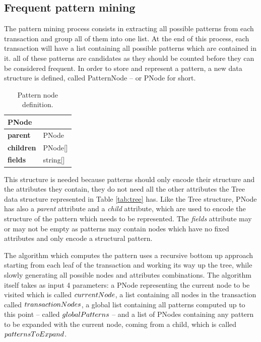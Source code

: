 \documentclass{acm_proc_article-sp-sigmod09}
\begin{document}
\subsection{Frequent pattern mining}
\label{sec:patternmining}

The pattern mining process consists in extracting all possible patterns from each transaction and group all of them into one list. At the end of this process, each transaction will have a list containing all possible patterns which are contained in it. all of these patterns are candidates as they should be counted before they can be considered frequent. In order to store and represent a pattern, a new data structure is defined, called PatternNode -- or PNode for short.

\begin{table}[H]
\centering
\begin{tabular}{|ll|} \hline
\textbf{PNode} & \\ \hline
\textbf{parent} & PNode \\ \hline
\textbf{children} & PNode[] \\ \hline
\textbf{fields} & string[] \\
\hline\end{tabular}
\caption{Pattern node definition.}
\label{tab:Ptree}
\end{table}

This structure is needed because patterns should only encode their structure and the attributes they contain, they do not need all the other attributes the Tree data structure represented in Table \ref{tab:tree} has. Like the Tree structure, PNode has also a \emph{parent} attribute and a \emph{child} attribute, which are used to encode the structure of the pattern which needs to be represented. The \emph{fields} attribute may or may not be empty as patterns may contain nodes which have no fixed attributes and only encode a structural pattern.

The algorithm which computes the pattern uses a recursive bottom up approach starting from each leaf of the transaction and working its way up the tree, while slowly generating all possible nodes and attributes combinations. The algorithm itself takes as input 4 parameters: a PNode representing the current node to be visited which is called $current\-Node$, a list containing all nodes in the transaction called $transaction\-Nodes$, a global list containing all patterns computed up to this point -- called $global\-Patterns$ -- and a list of PNodes containing any pattern to be expanded with the current node, coming from a child, which is called $patterns\-To\-Expand$.
\end{document}
